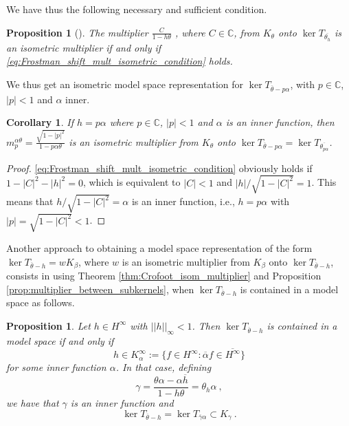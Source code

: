 \documentclass{article}
\numberwithin{equation}{section}
\theoremstyle{plain}
\newtheorem{prop}[thm]{Proposition}
\newtheorem{cor}[thm]{Corollary}
\newcommand{\Hinf}{\ensuremath{H^\infty}}
\newcommand{\CC}{\ensuremath{\mathbb{C}}}
\newcommand{\ol}[1]{\ensuremath{\overline{#1}}}
\begin{document}
We have thus the following necessary and sufficient condition.


\begin{prop}[{\cite{CaCarRoss24}}]
The multiplier $\frac{C}{1-h\theta}$ , where $C\in\CC$, from $K_\theta$ onto $\ker T_{\ol{\theta_h}}$ is an isometric multiplier if and only if \eqref{eq:Frostman_shift_mult_isometric_condition} holds.
\end{prop}


We thus get an isometric model space representation for $\ker T_{\ol\theta -p\alpha}$, with $p\in\CC$, $|p|<1$ and $\alpha$ inner.


\begin{cor}
\label{cor:Frostman_shift_h=p*alpha}
If $h=p\alpha$ where $p\in\CC$, $|p|<1$ and $\alpha$ is an inner function, then $m_p^{\alpha\theta} = \frac{\sqrt{1-|p|^2}}{1-p\alpha\theta}$ is an isometric multiplier from $K_\theta$ onto $\ker T_{\ol\theta -p\alpha} = \ker T_{\ol{\theta_{p\alpha}}}$.
\end{cor}

\begin{proof}
\eqref{eq:Frostman_shift_mult_isometric_condition} obviously holds if $1-|C|^2-|h|^2 = 0$, which is equivalent to $|C|<1$ and $|h|/ \sqrt{1-|C|^2} =1$.
This means that $h/ \sqrt{1-|C|^2} = \alpha$ is an inner function, i.e., $h=p\alpha$ with $|p|=\sqrt{1-|C|^2} <1$.
\end{proof}


Another approach to obtaining a model space representation of the form $\ker T_{\ol\theta -h} = w K_\beta$, where $w$ is an isometric multiplier from $K_\beta$ onto $\ker T_{\ol\theta -h}$, consists in using Theorem \ref{thm:Crofoot_isom_multiplier} and Proposition \ref{prop:multiplier_between_subkernels}, when $\ker T_{\ol\theta - h}$ is contained in a model space as follows.


\begin{prop}
\label{prop:ker_theta_h_contained_model_space}
Let $h\in\Hinf$ with $||h||_\infty <1$.
Then $\ker T_{\ol\theta -h}$ is contained in a model space if and only if
\begin{equation}
\label{eq:K_alpha_infty}
h\in K_\alpha^\infty := \{ f\in\Hinf : \ol\alpha f \in \ol\Hinf \}
\end{equation}
for some inner function $\alpha$.
In that case, defining
\begin{equation}
\label{eq:model_space_containing_Frostman_shift}
\gamma = \frac{\theta \alpha - \alpha \ol h}{1 - h\theta} = \theta_h \alpha \ ,
\end{equation}
we have that $\gamma$ is an inner function and
\begin{equation}
\label{eq:Frostman_shift_equal_gamma_alpha}
\ker T_{\ol\theta -h} = \ker T_{\ol\gamma \alpha} \subset K_\gamma \ .
\end{equation}
\end{prop}
\end{document}
